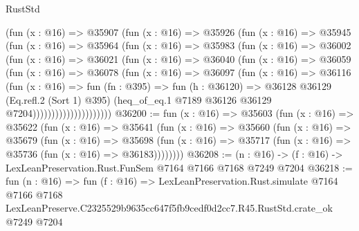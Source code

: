 \begin{lexlean}{RustStd}
\begin{coremodule}
                  (fun (x : @16) =>
                  @35907
                    (fun (x : @16) =>
                    @35926
                      (fun (x : @16) =>
                      @35945
                        (fun (x : @16) =>
                        @35964
                          (fun (x : @16) =>
                          @35983
                            (fun (x : @16) =>
                            @36002
                              (fun (x : @16) =>
                              @36021
                                (fun (x : @16) =>
                                @36040
                                  (fun (x : @16) =>
                                  @36059
                                    (fun (x : @16) =>
                                    @36078
                                      (fun (x : @16) =>
                                      @36097
                                        (fun (x : @16) =>
                                        @36116
                                          (fun (x : @16) =>
                                          fun (fn : @395) =>
                                          fun (h : @36120) =>
                                          @36128
                                            @36129
                                            (Eq.refl.{2} (Sort 1) @395)
                                            (heq_of_eq.{1}
                                              @7189
                                              @36126
                                              @36129
                                              @7204)))))))))))))))))))))
@36200 := fun (x : @16) =>
  @35603
    (fun (x : @16) =>
    @35622
      (fun (x : @16) =>
      @35641
        (fun (x : @16) =>
        @35660
          (fun (x : @16) =>
          @35679
            (fun (x : @16) =>
            @35698
              (fun (x : @16) => @35717 (fun (x : @16) => @35736 (fun (x : @16) => @36183))))))))
@36208 := (n : @16) -> (f : @16) -> LexLeanPreservation.Rust.FunSem @7164 @7166 @7168 @7249 @7204
@36218 := fun (n : @16) =>
  fun (f : @16) =>
  LexLeanPreservation.Rust.simulate
    @7164
    @7166
    @7168
    LexLeanPreserve.C2325529b9635cc647f5fb9cedf0d2cc7.R45.RustStd.crate_ok
    @7249
    @7204
\end{coremodule}
\end{lexlean}
